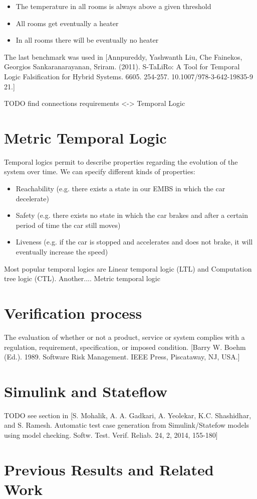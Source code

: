 \begin{itemize}
	\item The temperature in all rooms is always above a given threshold
	\item All rooms get eventually a heater
	\item In all rooms there will be eventually no heater
\end{itemize}

The last benchmark was used in [Annpureddy, Yashwanth Liu, Che  Fainekos, Georgios  Sankaranarayanan, Sriram. (2011). S-TaLiRo: A Tool for Temporal Logic Falsification for Hybrid Systems. 6605. 254-257. 10.1007/978-3-642-19835-9 21.]

TODO find connections requirements <-> Temporal Logic

\section{Metric Temporal Logic}

Temporal logics permit to describe properties regarding the evolution of the system over time. We can specify different kinds of properties:

\begin{itemize}
	\item Reachability (e.g. there exists a state in our EMBS in which the car decelerate)
	\item Safety (e.g. there exists no state in which the car brakes and after a certain period of time the car still moves)
	\item Liveness (e.g. if the car is stopped and accelerates and does not brake, it will eventually increase the speed)
\end{itemize}

Most popular temporal logics are Linear temporal logic (LTL) and Computation tree logic (CTL). Another....  Metric temporal logic

\section{Verification process}

The evaluation of whether or not a product, service or system complies with a regulation, requirement, specification, or imposed condition. [Barry W. Boehm (Ed.). 1989. Software Risk Management. IEEE Press, Piscataway, NJ, USA.]

\section{Simulink and Stateflow}

TODO see section in [S. Mohalik, A. A. Gadkari, A. Yeolekar, K.C. Shashidhar, and S. Ramesh. Automatic test case generation from Simulink/Statefow models using model checking. Softw. Test. Verif. Reliab. 24, 2, 2014, 155-180]

\section{Previous Results and Related Work}
%